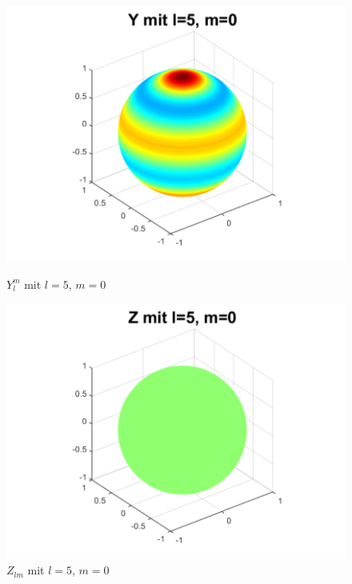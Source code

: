 \begin{figure}
\begin{minipage}[hbt]{0.4\textwidth}
\centering
\includegraphics[width=1\textwidth]{chapters/images/ylm/a_5_0.pdf}
\caption{$Y^m_l$ mit $l=5$, $m=0$}
\label{skript:ylm l=5 m=0}
\end{minipage}
\hfill
\begin{minipage}[hbt]{0.4\textwidth}
\centering
\includegraphics[width=1\textwidth]{chapters/images/ylm/b_5_0.pdf}
\caption{$Z_{lm}$ mit $l=5$, $m=0$}
\label{skript:zlm l=5 m=0}
\end{minipage}
\begin{minipage}[hbt]{0.4\textwidth}
\centering

\end{minipage}
\end{figure}
